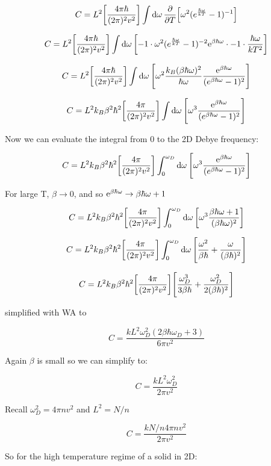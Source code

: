 \[ C = L^2  \brackets*{\frac{4\pi \hbar} {(2\pi)^2v^2 }} \int \dd{\omega} \pdv{}{T} \brackets*{\omega^2 (e^\frac{\hbar \omega}{k T}-1)^{-1}} \]

\[ C = L^2  \brackets*{\frac{4\pi \hbar} {(2\pi)^2v^2 }} \int \dd{\omega} \brackets*{-1 \cdot \omega^2 (e^\frac{\hbar \omega}{k T}-1)^{-2} \e^{\beta \hbar \omega} \cdot -1 \cdot \frac{\hbar \omega}{k T^2}} \]

\[ C = L^2  \brackets*{\frac{4\pi \hbar} {(2\pi)^2v^2 }} \int \dd{\omega} \brackets*{\omega^2     \frac{k_B (\beta \hbar \omega)^2}{\hbar \omega} \frac{\e^{\beta \hbar \omega}}{(e^{\beta \hbar \omega}-1)^{2}}} \]

\[ C = L^2  k_B \beta^2 \hbar^2 \brackets*{\frac{4\pi } {(2\pi)^2v^2 }} \int \dd{\omega} \brackets*{\omega^3 \frac{\e^{\beta \hbar \omega}}{(e^{\beta \hbar \omega}-1)^{2}}} \]

Now we can evaluate the integral from 0 to the 2D Debye frequency:

\[ C = L^2  k_B \beta^2 \hbar^2 \brackets*{\frac{4\pi } {(2\pi)^2v^2 }} \int_0^{\omega_D} \dd{\omega} \brackets*{\omega^3 \frac{\e^{\beta \hbar \omega}}{(e^{\beta \hbar \omega}-1)^{2}}} \]

For large T, $\beta \rightarrow 0$, and so $\mathrm{e}^{\beta \hbar \omega} \rightarrow \beta \hbar \omega + 1$


\[ C = L^2  k_B \beta^2 \hbar^2 \brackets*{\frac{4\pi } {(2\pi)^2v^2 }} \int_0^{\omega_D} \dd{\omega} \brackets*{\omega^3 \frac{\beta \hbar \omega + 1}{( \beta \hbar \omega)^{2}}} \]

\[ C = L^2  k_B \beta^2 \hbar^2 \brackets*{\frac{4\pi } {(2\pi)^2v^2 }} \int_0^{\omega_D} \dd{\omega} \brackets*{\frac{\omega^2}{\beta \hbar}+\frac{\omega}{(\beta \hbar)^2}} \]

\[ C = L^2  k_B \beta^2 \hbar^2 \brackets*{\frac{4\pi } {(2\pi)^2v^2 }} \brackets*{\frac{\omega_D^3}{3 \beta \hbar}+\frac{\omega_D^2}{2(\beta \hbar)^2}} \]

simplified with WA to

\[ C = \frac{k L^2 \omega_D^2 (2 \beta \hbar \omega_D + 3)}{6 \pi v^2}\]

Again $\beta$ is small so we can simplify to:

\[ C =  \frac{k L^2 \omega_D^2 }{2 \pi v^2}\]

Recall $\omega_D^2 = 4 \pi n v^2$ and $L^2 = N/n$


\[ C =  \frac{k N/n 4 \pi n v^2 }{2 \pi v^2}\]

So for the high temperature regime of a solid in 2D:

